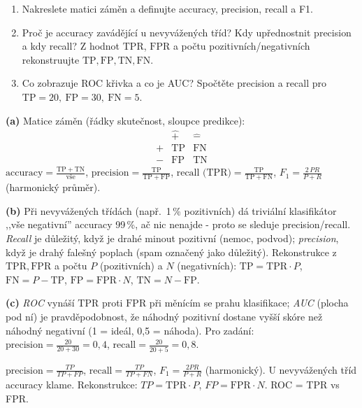 \begin{zadani}
\begin{enumerate}[label=(\alph*)]
  \item {} Nakreslete matici záměn a definujte accuracy, precision, recall a F1.
  \item {} Proč je accuracy zavádějící u nevyvážených tříd? Kdy upřednostnit precision a kdy recall? Z hodnot $\mathrm{TPR}$, $\mathrm{FPR}$ a počtu pozitivních/negativních rekonstruujte $\mathrm{TP,FP,TN,FN}$.
  \item {} Co zobrazuje ROC křivka a co je AUC? Spočtěte precision a recall pro $\mathrm{TP}=20,\ \mathrm{FP}=30,\ \mathrm{FN}=5$.
\end{enumerate}
\end{zadani}

\begin{reseni}
\textbf{(a)} Matice záměn (řádky skutečnost, sloupce predikce):
\[
\begin{array}{c|cc}
 & \hat{+} & \hat{-}\\\hline
+ & \mathrm{TP} & \mathrm{FN}\\
- & \mathrm{FP} & \mathrm{TN}
\end{array}
\]
$\text{accuracy}=\frac{\mathrm{TP+TN}}{\text{vše}}$, $\text{precision}=\frac{\mathrm{TP}}{\mathrm{TP+FP}}$, $\text{recall (TPR)}=\frac{\mathrm{TP}}{\mathrm{TP+FN}}$, $F_1=\frac{2\,PR}{P+R}$ (harmonický průměr).

\textbf{(b)} Při nevyvážených třídách (např.\ 1\,\% pozitivních) dá triviální klasifikátor ,,vše negativní'' accuracy 99\,\%, ač nic nenajde - proto se sleduje precision/recall. \emph{Recall} je důležitý, když je drahé minout pozitivní (nemoc, podvod); \emph{precision}, když je drahý falešný poplach (spam označený jako důležitý). Rekonstrukce z $\mathrm{TPR},\mathrm{FPR}$ a počtu $P$ (pozitivních) a $N$ (negativních): $\mathrm{TP}=\mathrm{TPR}\cdot P$, $\mathrm{FN}=P-\mathrm{TP}$, $\mathrm{FP}=\mathrm{FPR}\cdot N$, $\mathrm{TN}=N-\mathrm{FP}$.

\textbf{(c)} \emph{ROC} vynáší $\mathrm{TPR}$ proti $\mathrm{FPR}$ při měnícím se prahu klasifikace; \emph{AUC} (plocha pod ní) je pravděpodobnost, že náhodný pozitivní dostane vyšší skóre než náhodný negativní (1 = ideál, 0{,}5 = náhoda). Pro zadání: $\text{precision}=\frac{20}{20+30}=0{,}4$, $\text{recall}=\frac{20}{20+5}=0{,}8$.
\end{reseni}

\begin{jadro}
$\text{precision}=\frac{TP}{TP+FP}$, $\text{recall}=\frac{TP}{TP+FN}$, $F_1=\frac{2PR}{P+R}$ (harmonický). U nevyvážených tříd accuracy klame. Rekonstrukce: $TP=\mathrm{TPR}\cdot P$, $FP=\mathrm{FPR}\cdot N$. ROC = TPR vs FPR.
\end{jadro}

